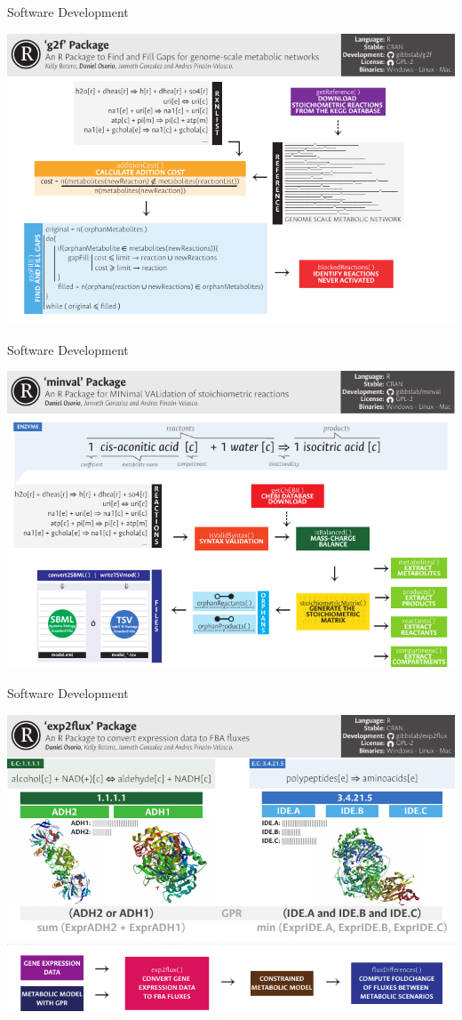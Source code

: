 \documentclass[11pt]{beamer}
\begin{document}
\begin{frame}{Software Development}
\begin{center}
\includegraphics[width=\textwidth]{g2f}
\end{center}
\end{frame}
\begin{frame}{Software Development}
\begin{center}
\includegraphics[width=\textwidth]{minval}
\end{center}
\end{frame}
\begin{frame}{Software Development}
\begin{center}
\includegraphics[width=\textwidth]{exp2flux}
\end{center}
\end{frame}
\end{document}
